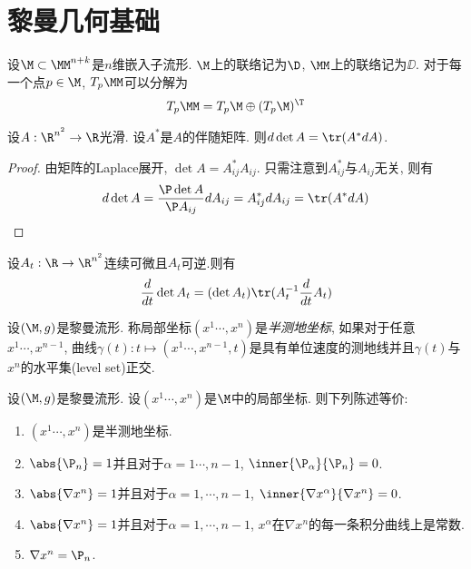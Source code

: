 \section{黎曼几何基础}
设$\M\subset \MM^{n+k}$是$n$维嵌入子流形. $\M$上的联络记为$\D$, $\MM$上的联络记为$\DD$. 对于每一个点$p \in \M$, $T_p\MM$可以分解为
\begin{equation}
    T_p\MM=T_p\M \oplus  (T_p\M)^\T
\end{equation}
\begin{lemma}
    设$A: \R^{n^2} \to \R$光滑. 设$A^*$是$A$的伴随矩阵. 则$d\det A=\tr(A^*dA)$.
\end{lemma}
\begin{proof}
    由矩阵的Laplace展开, $\det A=A^*_{ij}A_{ij}$. 只需注意到$A^*_{ij}$与$A_{ij}$无关, 则有
    \begin{equation}
        d\det A= \frac{\P \det A}{\P A_{ij}}dA_{ij}=A^*_{ij}dA_{ij}=\tr(A^*dA)
    \end{equation}
\end{proof}
\begin{corollary}
    设$A_t: \R \to \R^{n^2}$连续可微且$A_t$可逆.则有
    \begin{equation}
        \frac{d}{dt}\det A_t=(\det A_t)\tr(A^{-1}_t\frac{d}{dt}A_t)
    \end{equation}
\end{corollary}
\begin{definition}
    设$(\M,g)$是黎曼流形.  称局部坐标$(x^1\cdots, x^n)$是\textit{半测地坐标}, 如果对于任意$x^1\cdots, x^{n-1}$, 曲线$\gamma(t): t \mapsto (x^1\cdots,x^{n-1},t)$是具有单位速度的测地线并且$\gamma(t)$与$x^n$的水平集(level set)正交.
\end{definition}
\begin{lemma}
    设$(\M,g)$是黎曼流形.  设$(x^1\cdots, x^n)$是$\M$中的局部坐标. 则下列陈述等价:
    \begin{enumerate}
        \item $(x^1\cdots, x^n)$是半测地坐标.
        \item $\abs{\P_n}=1$并且对于$\alpha=1\cdots,n-1$, $\inner{\P_\alpha}{\P_n}=0$.
        \item $\abs{\nabla x^n}=1$并且对于$\alpha=1,\cdots,n-1$, $\inner{\nabla x^\alpha}{\nabla x^n}=0$.
        \item $\abs{\nabla x^n}=1$并且对于$\alpha=1,\cdots,n-1$, $x^\alpha$在$\nabla x^n$的每一条积分曲线上是常数.
        \item $\nabla x^n=\P_n$.
    \end{enumerate}
\end{lemma}

